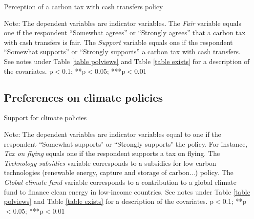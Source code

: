 \documentclass{article}
\begin{document}
\begin{table}[h!]
	\caption{Perception of a carbon tax with cash transfers policy}
	\begin{center}
		\scalebox{0.7}{}
	\end{center}
	{\footnotesize Note: The dependent variables are indicator variables. The \textit{Fair} variable equals one if the respondent ``Somewhat agrees'' or ``Strongly agrees'' that a carbon tax with cash transfers is fair. The \textit{Support} variable equals one if the respondent ``Somewhat supports'' or ``Strongly supports'' a carbon tax with cash transfers. See notes under Table \ref{table polviews} and Table \ref{table exists} for a description of the covariates.
	\newline *p$<$0.1; **p$<$0.05; ***p$<$0.01}
\end{table}	



\clearpage
\subsection{Preferences on climate policies}



\begin{table}[h!]
	\caption{Support for climate policies}
	\begin{center}
		\scalebox{0.7}{}
	\end{center}
	{\footnotesize Note: The dependent variables are indicator variables equal to one if the respondent ``Somewhat supports" or ``Strongly supports" the policy. For instance, \textit{Tax on flying} equals one if the respondent supports a tax on flying. The \textit{Technology subsidies} variable corresponds to a subsidies for low-carbon technologies (renewable energy, capture and storage of carbon...) policy. The \textit{Global climate fund} variable corresponds to a contribution to a global climate fund to finance clean energy in low-income countries. See notes under Table \ref{table polviews} and Table \ref{table exists} for a description of the covariates.
	\newline *p$<$0.1; **p$<$0.05; ***p$<$0.01}
\end{table}	
\end{document}
